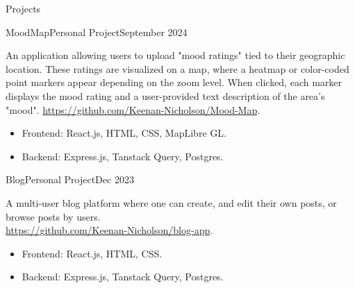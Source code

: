 \documentclass[]{Keenan-Nicholson-Resume}
\begin{document}
\begin{section}{Projects}
\begin{subsectionnobullet}{MoodMap}{Personal Project}{September 2024}{}
    \item{An application allowing users to upload "mood ratings" tied to their geographic location. These ratings are visualized on a map, where a heatmap or color-coded point markers appear depending on the zoom level. When clicked, each marker displays the mood rating and a user-provided text description of the area's "mood". \href{https://github.com/Keenan-Nicholson/Mood-Map}{https://github.com/Keenan-Nicholson/Mood-Map}.}
            \vspace{-4pt}
        \begin{itemize}[itemsep=-6.5pt]
            \item Frontend: React.js, HTML, CSS, MapLibre GL.
            \item Backend: Express.js, Tanstack Query, Postgres.
        \end{itemize}
\end{subsectionnobullet}
\begin{subsectionnobullet}{Blog}{Personal Project}{Dec 2023}{}
    \item{A multi-user blog platform where one can create, and edit their own posts, or browse posts by users. \\ 
    \href{https://github.com/Keenan-Nicholson/blog-app}{https://github.com/Keenan-Nicholson/blog-app}.}
            \vspace{-4pt}
        \begin{itemize}[itemsep=-6.5pt]
            \item Frontend: React.js, HTML, CSS.
            \item Backend: Express.js, Tanstack Query, Postgres.
        \end{itemize}
\end{subsectionnobullet}
\end{section}

\end{document}
